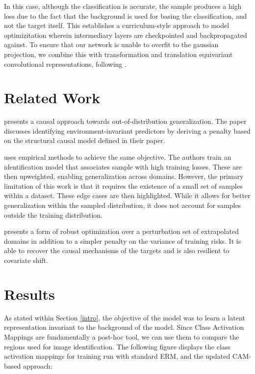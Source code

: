 \documentclass{article} %
\begin{document}
In this case, although the classification is accurate, the sample produces a high loss due to the fact that the background is used for basing the classification, and not the target itself. This establishes a curriculum-style approach to model optimizitation wherein intermediary layers are checkpointed and backpropagated against. To ensure that our network is unable to overfit to the gaussian projection, we combine this with transformation and translation equivariant convolutional representations, following \citep{mouli2021neural}.

\section{Related Work}

\cite{arjovsky2019invariant} presents a causal approach towards out-of-distribution generalization. The paper discusses identifying environment-invariant predictors by deriving a penalty based on the structural causal model defined in their paper.

\cite{liu2021just} uses empirical methods to achieve the same objective. The authors train an identification model that associates sample with high training losses. These are then upweighted, enabling generalization across domains. However, the primary limitation of this work is that it requires the existence of a small set of samples within a dataset. These edge cases are then highlighted. While it allows for better generalization within the sampled distribution, it does not account for samples outside the training distribution.

\cite{krueger2021out} presents a form of robust optimization over a perturbation set of extrapolated domains in addition to a simpler penalty on the variance of training risks. It is able to recover the causal mechanisms of the targets and is also resilient to covariate shift.


\section{Results}

As stated within Section \ref{intro}, the objective of the model was to learn a latent representation invariant to the background of the model. Since Class Activation Mappings are fundamentally a post-hoc tool, we can use them to compare the regions used for image identification. The following figure displays the class activation mappings for training run with standard ERM, and the updated CAM-based approach:
\end{document}
